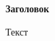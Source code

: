 \documentclass{article}
\begin{document}
    \huge{\textbf{Заголовок}}\\\small
    
    Текст
    
\end{document}
